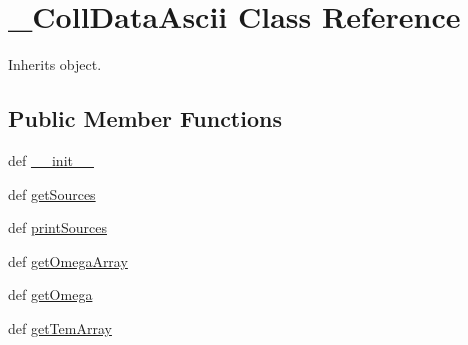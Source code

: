 \hypertarget{classpyneb_1_1core_1_1pynebcore_1_1___coll_data_ascii}{\section{\-\_\-\-Coll\-Data\-Ascii Class Reference}
\label{classpyneb_1_1core_1_1pynebcore_1_1___coll_data_ascii}
}


Inherits object.

\subsection*{Public Member Functions}
\begin{DoxyCompactItemize}
\item 
def \hyperlink{classpyneb_1_1core_1_1pynebcore_1_1___coll_data_ascii_ac775ee34451fdfa742b318538164070e}{\-\_\-\-\_\-init\-\_\-\-\_\-}
\item 
def \hyperlink{classpyneb_1_1core_1_1pynebcore_1_1___coll_data_ascii_a13685d48c0180c5463a5dffebcd4fb29}{get\-Sources}
\item 
def \hyperlink{classpyneb_1_1core_1_1pynebcore_1_1___coll_data_ascii_a0120b7dbd5f911f8b1df2d2cebf6c09c}{print\-Sources}
\item 
def \hyperlink{classpyneb_1_1core_1_1pynebcore_1_1___coll_data_ascii_abe866c7263d184180cefd99da4439667}{get\-Omega\-Array}
\item 
def \hyperlink{classpyneb_1_1core_1_1pynebcore_1_1___coll_data_ascii_aaf6e92dda1e6d1aa7d06098b4e9a4e6d}{get\-Omega}
\item 
def \hyperlink{classpyneb_1_1core_1_1pynebcore_1_1___coll_data_ascii_a903ccea78642f5853c9a01b1616c6899}{get\-Tem\-Array}
\end{DoxyCompactItemize}
